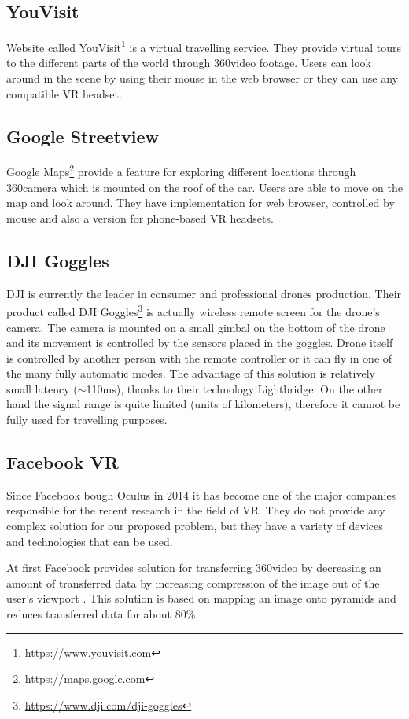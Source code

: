\subsection{YouVisit}
Website called YouVisit\footnote{\url{https://www.youvisit.com}} is a virtual travelling service. They provide virtual tours to the different parts of the world through 360\degree video footage. Users can look around in the scene by using their mouse in the web browser or they can use any compatible VR headset.

\subsection{Google Streetview}
Google Maps\footnote{\url{https://maps.google.com}} provide a feature for exploring different locations through 360\degree camera which is mounted on the roof of the car. Users are able to move on the map and look around. They have implementation for web browser, controlled by mouse and also a version for phone-based VR headsets.

\subsection{DJI Goggles}
DJI is currently the leader in consumer and professional drones production. Their product called DJI Goggles\footnote{\url{https://www.dji.com/dji-goggles}} is actually wireless remote screen for the drone's camera. The camera is mounted on a small gimbal on the bottom of the drone and its movement is controlled by the sensors placed in the goggles. Drone itself is controlled by another person with the remote controller or it can fly in one of the many fully automatic modes. The advantage of this solution is relatively small latency ($\sim$110ms), thanks to their technology Lightbridge. On the other hand the signal range is quite limited (units of kilometers), therefore it cannot be fully used for travelling purposes.

\subsection{Facebook VR}
Since Facebook bough Oculus in 2014 it has become one of the major companies responsible for the recent research in the field of VR. They do not provide any complex solution for our proposed problem, but they have a variety of devices and technologies that can be used.

At first Facebook provides solution for transferring 360\degree video by decreasing an amount of transferred data by increasing compression of the image out of the user's viewport \cite{facebook2016videoencoding}. This solution is based on mapping an image onto pyramids and reduces transferred data for about 80\%. 

